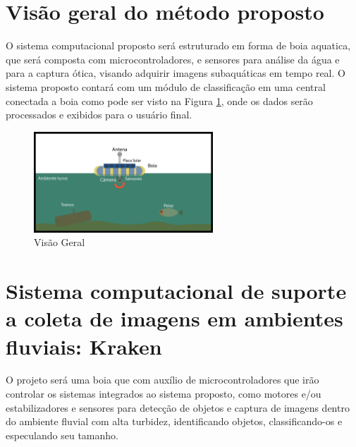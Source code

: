 \label{chapter:metodo}
\section{Visão geral do método proposto}
   
O sistema computacional proposto será estruturado em forma de boia aquatica, que será composta com microcontroladores, e sensores para análise da água e para a captura ótica, visando adquirir imagens subaquáticas em tempo real. O sistema proposto contará com um módulo de classificação em uma central conectada a boia como pode ser visto na Figura \ref{fig:bigpic}, onde os dados serão processados e exibidos para o usuário final. 
   

\begin{figure}[ht]
	\centering
    \caption{\label{fig:bigpic}Visão Geral}
	\includegraphics[width = 0.6\textwidth]{resources/bugpicturefloater}
\end{figure}


\section{Sistema computacional de suporte a coleta de imagens em ambientes fluviais: Kraken}

O projeto será uma boia que com auxílio de microcontroladores que irão controlar os sistemas integrados ao sistema proposto, como motores e/ou estabilizadores e sensores para detecção de objetos e captura de imagens dentro do ambiente fluvial com alta turbidez, identificando objetos, classificando-os e especulando seu tamanho.


